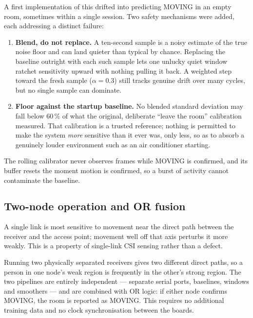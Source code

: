 \documentclass[11pt,a4paper]{article}
\begin{document}
A first implementation of this drifted into predicting MOVING in an empty room,
sometimes within a single session. Two safety mechanisms were added, each
addressing a distinct failure:

\begin{enumerate}[leftmargin=1.6em, itemsep=3pt]
  \item \textbf{Blend, do not replace.} A ten-second sample is a noisy estimate
        of the true noise floor and can land quieter than typical by chance.
        Replacing the baseline outright with each such sample lets one unlucky
        quiet window ratchet sensitivity upward with nothing pulling it back.
        A weighted step toward the fresh sample ($\alpha = 0.3$) still tracks
        genuine drift over many cycles, but no single sample can dominate.
  \item \textbf{Floor against the startup baseline.} No blended standard
        deviation may fall below 60\,\% of what the original, deliberate
        ``leave the room'' calibration measured. That calibration is a trusted
        reference; nothing is permitted to make the system \emph{more}
        sensitive than it ever was, only less, so as to absorb a genuinely
        louder environment such as an air conditioner starting.
\end{enumerate}

\noindent
The rolling calibrator never observes frames while MOVING is confirmed, and its
buffer resets the moment motion is confirmed, so a burst of activity cannot
contaminate the baseline.

\subsection{Two-node operation and OR fusion}

A single link is most sensitive to movement near the direct path between the
receiver and the access point; movement well off that axis perturbs it more
weakly. This is a property of single-link CSI sensing rather than a defect.

Running two physically separated receivers gives two different direct paths, so
a person in one node's weak region is frequently in the other's strong region.
The two pipelines are entirely independent --- separate serial ports, baselines,
windows and smoothers --- and are combined with OR logic: if either node
confirms MOVING, the room is reported as MOVING. This requires no additional
training data and no clock synchronisation between the boards.
\end{document}
